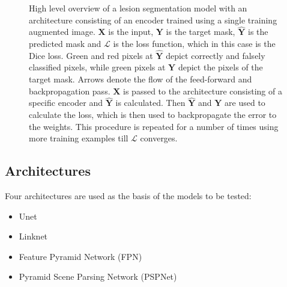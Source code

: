\documentclass{elsarticle}
\providecommand{\FILEPATH}{~/github.com/pbizopoulos/comprehensive-comparison-of-deep-learning-models-for-lung-and-covid-19-lesion-segmentation-in-ct/packages/default/tmp}
\begin{document}
\begin{figure}[!t]
  \centering
  \caption{High level overview of a lesion segmentation model with an architecture consisting of an encoder trained using a single training augmented image.
    $\bm{X}$ is the input, $\bm{Y}$ is the target mask, $\hat{\bm{Y}}$ is the predicted mask and $\mathcal{L}$ is the loss function, which in this case is the Dice loss.
    Green and red pixels at $\hat{\bm{Y}}$ depict correctly and falsely classified pixels, while green pixels at $\bm{Y}$ depict the pixels of the target mask.
    Arrows denote the flow of the feed-forward and backpropagation pass.
    $\bm{X}$ is passed to the architecture consisting of a specific encoder and $\hat{\bm{Y}}$ is calculated.
    Then $\hat{\bm{Y}}$ and $\bm{Y}$ are used to calculate the loss, which is then used to backpropagate the error to the weights.
  This procedure is repeated for a number of times using more training examples till $\mathcal{L}$ converges.}\label{fig:highleveloverview}
\end{figure}

\subsection{Architectures}\label{sec:architectures}
Four architectures are used as the basis of the models to be tested:
\begin{itemize}
  \item Unet~\cite{ronneberger2015u}
  \item Linknet~\cite{chaurasia2017linknet}
  \item Feature Pyramid Network (FPN)~\cite{lin2017feature}
  \item Pyramid Scene Parsing Network (PSPNet)~\cite{zhao2017pyramid}
\end{itemize}
\end{document}
